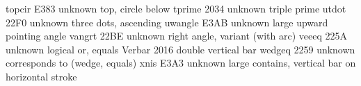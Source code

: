  topcir                           E383 {unknown} top, circle below
 tprime                           2034 {unknown} triple prime
 utdot                            22F0 {unknown} three dots, ascending
 uwangle                          E3AB {unknown} large upward pointing angle
 vangrt                           22BE {unknown} right angle, variant (with arc)
 veeeq                            225A {unknown} logical or, equals
 Verbar                           2016 {\Vert} double vertical bar
 wedgeq                           2259 {unknown} corresponds to (wedge, equals)
 xnis                             E3A3 {unknown} large contains, vertical bar on horizontal stroke
